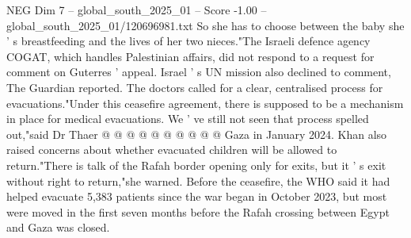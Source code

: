 \begin{textsample}{NEG Dim 7 – global\_south\_2025\_01 – Score -1.00 – global\_south\_2025\_01/120696981.txt}
So she has to choose between the baby she ' s breastfeeding and the lives of her two nieces."The Israeli defence agency COGAT, which handles Palestinian affairs, did not respond to a request for comment on Guterres ' appeal.
Israel ' s UN mission also declined to comment, The Guardian reported.
The doctors called for a clear, centralised process for evacuations."Under this ceasefire agreement, there is supposed to be a mechanism in place for medical evacuations.
We ' ve still not seen that process spelled out,"said Dr Thaer @ @ @ @ @ @ @ @ @ @ Gaza in January 2024.
Khan also raised concerns about whether evacuated children will be allowed to return."There is talk of the Rafah border opening only for exits, but it ' s exit without right to return,"she warned.
Before the ceasefire, the WHO said it had helped evacuate 5,383 patients since the war began in October 2023, but most were moved in the first seven months before the Rafah crossing between Egypt and Gaza was closed.

\end{textsample}
